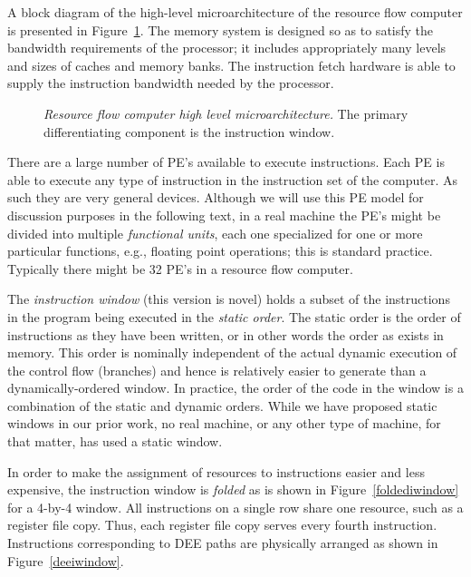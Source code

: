 \documentclass[10pt,dvips]{article}
\begin{document}
A block diagram of the high-level microarchitecture of the resource flow computer is
presented in Figure~\ref{highlevelma}. The memory system is designed so as to
satisfy the bandwidth requirements of the processor; it includes appropriately many
levels and sizes of caches and memory banks. The instruction fetch hardware is able
to supply the instruction bandwidth needed by the processor.

\begin{figure}
\centering
{}
\caption{{\em Resource flow computer high level microarchitecture.}
The primary differentiating component is the instruction window.}
\label{highlevelma}
\end{figure}

There are a large number of PE's available to execute
instructions. Each PE is able to execute any type of instruction in the instruction
set of the computer. As such they are very general devices. Although we will use this
PE model for discussion purposes in the following text, in a real machine the PE's
might be divided into multiple {\it functional units}, each one specialized for
one or more particular functions, e.g., floating point operations; this is standard
practice. Typically there might be 32 PE's in a resource flow computer.

The {\it instruction window} (this version is novel)
holds a subset of the instructions in the program
being executed in the {\it static order}. The static order is the order of
instructions as they have been written, or in other words the order as exists
in memory. This order is nominally independent of the actual dynamic execution
of the control flow (branches) and hence is relatively easier to generate than
a dynamically-ordered window. In practice, the order of the code in the window
is a combination of the static and dynamic orders. While we have proposed
static windows in our prior work\cite{Uht95,Uht91,Uht92}, no real machine,
or any other type of machine, for that matter, has used a static window.

In order to make the assignment of resources to instructions
easier and less expensive, the instruction window is {\it folded} as is shown in
Figure~\ref{foldediwindow} for a 4-by-4 window. All instructions on a single row
share one resource, such as a register file copy. Thus, each register file copy
serves every fourth instruction. 
Instructions corresponding to DEE paths are physically arranged as shown in
Figure~\ref{deeiwindow}.
\end{document}
